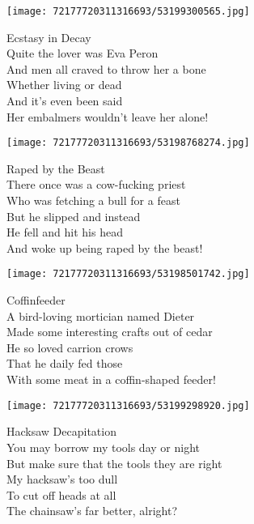 \documentclass[10pt,letterpaper]{article}
\begin{document}
\begin{center}
\texttt{[image: 72177720311316693/53199300565.jpg]}
\end{center}

\begin{center}
Ecstasy in Decay\\
\vskip 0.2in
Quite the lover was Eva Peron\\
And men all craved to throw her a bone\\
Whether living or dead\\
And it's even been said\\
Her embalmers wouldn't leave her alone!\\
\end{center}
\pagebreak

\begin{center}
\texttt{[image: 72177720311316693/53198768274.jpg]}
\end{center}

\begin{center}
Raped by the Beast\\
\vskip 0.2in
There once was a cow-fucking priest\\
Who was fetching a bull for a feast\\
But he slipped and instead\\
He fell and hit his head\\
And woke up being raped by the beast!\\
\end{center}
\pagebreak

\begin{center}\texttt{[image: 72177720311316693/53198501742.jpg]}
\end{center}
\begin{center}
Coffinfeeder\\
\vskip 0.2in
A bird-loving mortician named Dieter\\
Made some interesting crafts out of cedar\\
He so loved carrion crows\\
That he daily fed those\\
With some meat in a coffin-shaped feeder!\\
\end{center}
\pagebreak

\begin{center}\texttt{[image: 72177720311316693/53199298920.jpg]}
\end{center}
\begin{center}
Hacksaw Decapitation\\
\vskip 0.2in
You may borrow my tools day or night\\
But make sure that the tools they are right\\
My hacksaw's too dull\\
To cut off heads at all\\
The chainsaw's far better, alright?\\
\end{center}
\pagebreak
\end{document}
